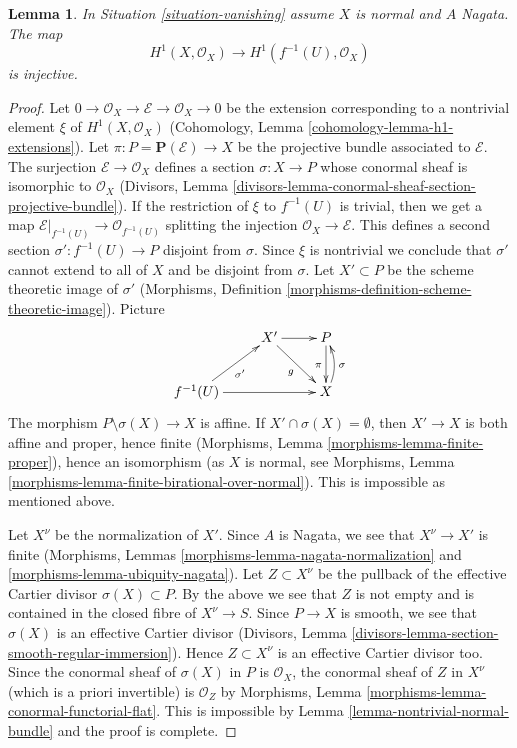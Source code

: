 \documentclass{stacks-project}
\theoremstyle{plain}
\newtheorem{lemma}[subsection]{Lemma}
\theoremstyle{definition}
\theoremstyle{remark}
\numberwithin{equation}{subsection}
\begin{document}
\begin{lemma}
\label{lemma-H1-injective}
In Situation \ref{situation-vanishing} assume $X$ is normal
and $A$ Nagata. The map
$$
H^1(X, \mathcal{O}_X) \longrightarrow H^1(f^{-1}(U), \mathcal{O}_X)
$$
is injective.
\end{lemma}

\begin{proof}
Let $0 \to \mathcal{O}_X \to \mathcal{E} \to \mathcal{O}_X \to 0$ be the
extension corresponding to a nontrivial element $\xi$ of
$H^1(X, \mathcal{O}_X)$
(Cohomology, Lemma \ref{cohomology-lemma-h1-extensions}).
Let $\pi : P = \mathbf{P}(\mathcal{E}) \to X$
be the projective bundle associated to $\mathcal{E}$.
The surjection $\mathcal{E} \to \mathcal{O}_X$
defines a section $\sigma : X \to P$ whose conormal sheaf is
isomorphic to $\mathcal{O}_X$ (Divisors, Lemma
\ref{divisors-lemma-conormal-sheaf-section-projective-bundle}).
If the restriction of $\xi$ to $f^{-1}(U)$ is trivial, then we get
a map $\mathcal{E}|_{f^{-1}(U)} \to \mathcal{O}_{f^{-1}(U)}$ splitting
the injection $\mathcal{O}_X \to \mathcal{E}$. This defines a second
section $\sigma' : f^{-1}(U) \to P$ disjoint from $\sigma$. Since $\xi$
is nontrivial we conclude that $\sigma'$ cannot extend to all of $X$
and be disjoint from $\sigma$. Let $X' \subset P$ be the
scheme theoretic image of $\sigma'$ (Morphisms,
Definition \ref{morphisms-definition-scheme-theoretic-image}).
Picture
$$
\xymatrix{
& X' \ar[rd]_g \ar[r] & P \ar[d]_\pi \\
f^{-1}(U) \ar[ru]_{\sigma'} \ar[rr] & & X \ar@/_/[u]_\sigma
}
$$
The morphism $P \setminus \sigma(X) \to X$ is affine.
If $X' \cap \sigma(X) = \emptyset$, then $X' \to X$ is both affine
and proper, hence finite
(Morphisms, Lemma \ref{morphisms-lemma-finite-proper}),
hence an isomorphism (as $X$ is normal, see
Morphisms, Lemma \ref{morphisms-lemma-finite-birational-over-normal}).
This is impossible as mentioned above.

\medskip\noindent
Let $X^\nu$ be the normalization of $X'$.
Since $A$ is Nagata, we see that $X^\nu \to X'$ is finite
(Morphisms, Lemmas \ref{morphisms-lemma-nagata-normalization} and
\ref{morphisms-lemma-ubiquity-nagata}). Let $Z \subset X^\nu$ be the
pullback of the effective Cartier divisor $\sigma(X) \subset P$.
By the above we see that $Z$ is not empty and is contained
in the closed fibre of $X^\nu \to S$.
Since $P \to X$ is smooth, we see that $\sigma(X)$ is an effective
Cartier divisor
(Divisors, Lemma \ref{divisors-lemma-section-smooth-regular-immersion}).
Hence $Z \subset X^\nu$ is an effective Cartier divisor too.
Since the conormal sheaf of $\sigma(X)$ in $P$ is $\mathcal{O}_X$, the
conormal sheaf of $Z$ in $X^\nu$ (which is a priori invertible)
is $\mathcal{O}_Z$ by
Morphisms, Lemma \ref{morphisms-lemma-conormal-functorial-flat}.
This is impossible by
Lemma \ref{lemma-nontrivial-normal-bundle}
and the proof is complete.
\end{proof}
\end{document}
